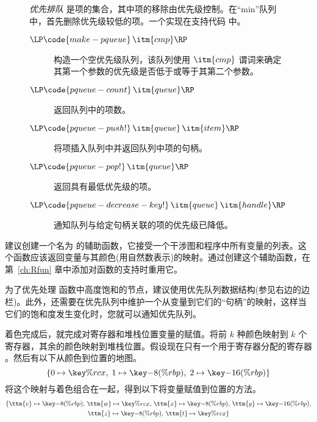 \documentclass[11pt]{book}
\begin{document}
\begin{wrapfigure}[20]{r}[1.0in]{0.6\textwidth}
  \small
  \begin{tcolorbox}[title=优先排队]
    \emph{优先排队} 是项的集合，其中项的移除由优先级控制。在“min”队列中，首先删除优先级较低的项。一个实现在支持代码
     中。   
  \begin{description}
  \item[$\LP\code{make-pqueue}\,\itm{cmp}\RP$] 构造一个空优先级队列，该队列使用 $\itm{cmp}$ 谓词来确定其第一个参数的优先级是否低于或等于其第二个参数。
  \item[$\LP\code{pqueue-count}\,\itm{queue}\RP$] 返回队列中的项数。
  \item[$\LP\code{pqueue-push!}\,\itm{queue}\,\itm{item}\RP$] 将项插入队列中并返回队列中项的句柄。
  \item[$\LP\code{pqueue-pop!}\,\itm{queue}\RP$] 返回具有最低优先级的项。
  \item[$\LP\code{pqueue-decrease-key!}\,\itm{queue}\,\itm{handle}\RP$]
    通知队列与给定句柄关联的项的优先级已降低。
  \end{description}
\end{tcolorbox}
\end{wrapfigure}

建议创建一个名为 
的辅助函数，它接受一个干涉图和程序中所有变量的列表。这个函数应该返回变量与其颜色(用自然数表示)的映射。通过创建这个辅助函数，在第~\ref{ch:Rfun}
章中添加对函数的支持时重用它。

为了优先处理
函数中高度饱和的节点，建议使用优先队列数据结构(参见右边的边栏)。此外，还需要在优先队列中维护一个从变量到它们的“句柄”的映射，这样当它们的饱和度发生变化时，您就可以通知优先队列。

着色完成后，就完成对寄存器和堆栈位置变量的赋值。将前 $k$ 种颜色映射到 $k$
个寄存器，其余的颜色映射到堆栈位置。假设现在只有一个用于寄存器分配的寄存器  。然后有以下从颜色到位置的地图。
\[
  \{ 0 \mapsto \key{\%rcx}, \; 1 \mapsto \key{-8(\%rbp)}, \; 2 \mapsto \key{-16(\%rbp)} \}
\]
将这个映射与着色组合在一起，得到以下将变量赋值到位置的方法。
\begin{gather*}
  \{ \ttm{v} \mapsto \key{-8(\%rbp)}, \,
     \ttm{w} \mapsto \key{\%rcx},  \,
     \ttm{x} \mapsto \key{-8(\%rbp)}, \,
     \ttm{y} \mapsto \key{-16(\%rbp)}, \\
     \ttm{z} \mapsto \key{-8(\%rbp)}, \,
     \ttm{t} \mapsto \key{\%rcx} \}
\end{gather*}
\end{document}
